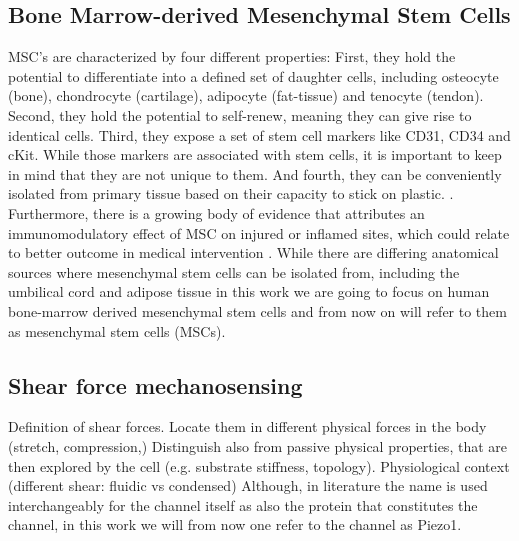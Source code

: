 \subsection{Bone Marrow-derived Mesenchymal Stem Cells}
MSC's are characterized by four different properties: First, they hold the potential to differentiate into a defined set of daughter cells, including osteocyte (bone), chondrocyte (cartilage), adipocyte (fat-tissue) and tenocyte (tendon).\cite{Ng2008} Second, they hold the potential to self-renew, meaning they can give rise to identical cells. Third, they expose a set of stem cell markers like CD31, CD34 and cKit. While those markers are associated with stem cells, it is important to keep in mind that they are not unique to them. \cite{Battula2009} And fourth, they can be conveniently isolated from primary tissue based on their capacity to stick on plastic. \cite{Buhring2007}. Furthermore, there is a growing body of evidence that attributes an immunomodulatory effect of MSC on injured or inflamed sites, which could relate to better outcome in medical intervention \cite{Hass2011, Caplan2011}.
While there are differing anatomical sources where mesenchymal stem cells can be isolated from, including the umbilical cord and adipose tissue \cite{Barlow2008, Hass2011} in this work we are going to focus on human bone-marrow derived mesenchymal stem cells and from now on will refer to them as mesenchymal stem cells (MSCs).

\subsection{Shear force mechanosensing}
Definition of shear forces. Locate them in different physical forces in the body (stretch, compression,) Distinguish also from passive physical properties, that are then explored by the cell (e.g. substrate stiffness, topology).
Physiological context (different shear: fluidic vs condensed)
Although, in literature the name \Piezo{} is used interchangeably for the channel itself as also the protein that constitutes the channel, in this work we will from now one refer to the channel as Piezo1.

